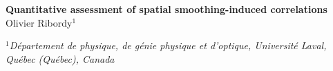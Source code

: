 \documentclass{article}
\begin{document}
\usetikzlibrary{calc,patterns,angles,quotes}
\begin{center}

    {\Large \textbf{Quantitative assessment of spatial smoothing-induced correlations}}\\
    
    \vspace{10 pt}
    Olivier Ribordy$^{1}$ \\
    \vspace{5 pt}
    
    $^1$\textit{Département de physique, de génie physique et d'optique, Université Laval, Québec (Québec), Canada}
    

\end{center}

\vspace{10 pt}
\end{document}
